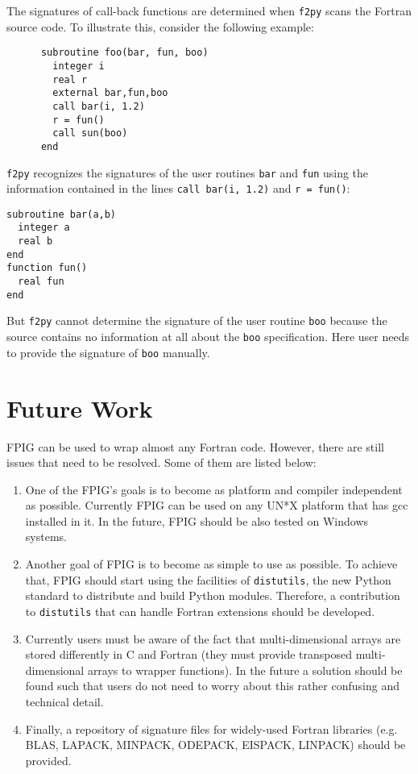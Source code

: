 \documentclass[twocolumn]{article}
\newcommand{\fpy}{\texttt{f2py}\xspace}
\begin{document}
The signatures of call-back functions are determined when \fpy scans
the Fortran source code. To illustrate this, consider the following
example:
\begin{verbatim}
      subroutine foo(bar, fun, boo)
        integer i
        real r
        external bar,fun,boo
        call bar(i, 1.2)
        r = fun()
        call sun(boo)
      end
\end{verbatim}
\fpy recognizes the signatures of the user routines \texttt{bar} and
\texttt{fun} using the information contained in the lines \texttt{call
  bar(i, 1.2)} and \texttt{r = fun()}:
\begin{verbatim}
subroutine bar(a,b)
  integer a
  real b
end
function fun()
  real fun
end
\end{verbatim}
But \fpy cannot determine the signature of the user routine
\texttt{boo} because the source contains no information at all about
the \texttt{boo} specification. Here user needs to provide the
signature of \texttt{boo} manually.

\section{Future Work}
\label{sec:future}

FPIG can be used to wrap almost any Fortran code. However, there are
still issues that need to be resolved. Some of them are listed below:
\begin{enumerate}
\item One of the FPIG's goals is to become as platform and compiler
  independent as possible. Currently FPIG can be used on
  any UN*X platform that has gcc installed in it. In the future, FPIG
  should be also tested on Windows systems.
\item Another goal of FPIG is to become as simple to use as
  possible. To achieve that, FPIG should start using the facilities of
  \texttt{distutils}, the new Python standard to distribute and build
  Python modules. Therefore, a contribution to \texttt{distutils}
  that can handle Fortran extensions should be developed.
\item Currently users must be aware of
  the fact that multi-dimensional arrays are stored differently in C
  and Fortran (they must provide transposed multi-dimensional arrays
  to wrapper functions). In the future a solution should be found such
  that users do not need to worry about this rather
  confusing and technical detail.
\item Finally, a repository of signature files for widely-used Fortran
  libraries (e.g. BLAS, LAPACK, MINPACK, ODEPACK, EISPACK, LINPACK) should be
  provided.
\end{enumerate}
\end{document}
